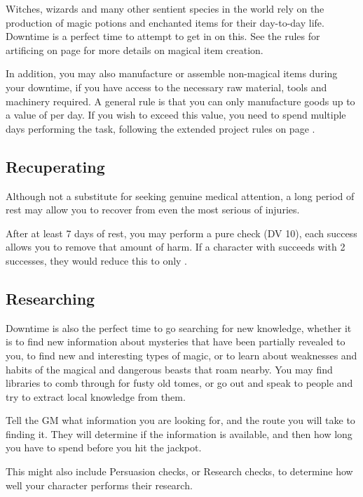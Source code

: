 Witches, wizards and many other sentient species in the world rely on the production of magic potions and enchanted items for their day-to-day life. Downtime is a perfect time to attempt to get in on this. See the rules for artificing on page \pageref{S:Artificing} for more details on magical item creation.

In addition, you may also manufacture or assemble non-magical items during your downtime, if you have access to the necessary raw material, tools and machinery required. A general rule is that you can only manufacture goods up to a value of  per day. If you wish to exceed this value, you need to spend multiple days performing the task, following the extended project rules on page \pageref{S:Extended}.

\subsection{Recuperating}

Although not a substitute for seeking genuine medical attention, a long period of rest may allow you to recover from even the most serious of injuries. 

After at least 7 days of rest, you may perform a pure  check (DV 10), each success allows you to remove that amount of harm. If a character with  succeeds with 2 successes, they would reduce this to only .


\subsection{Researching}

Downtime is also the perfect time to go searching for new knowledge, whether it is to find new information about mysteries that have been partially revealed to you, to find new and interesting types of magic, or to learn about weaknesses and habits of the magical and dangerous beasts that roam nearby. You may find libraries to comb through for fusty old tomes, or go out and speak to people and try to extract local knowledge from them. 

Tell the GM what information you are looking for, and the route you will take to finding it. They will determine if the information is available, and then how long you have to spend before you hit the jackpot. 

This might also include Persuasion checks, or Research checks, to determine how well your character performs their research. 
 

